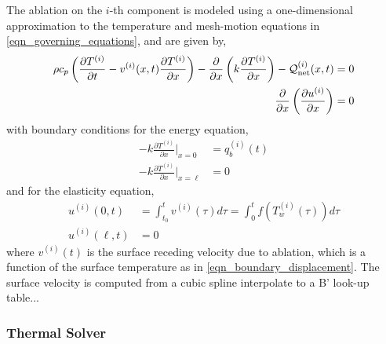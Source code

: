 The ablation on the $i$-th component is modeled using a one-dimensional approximation to the temperature and mesh-motion equations in \cref{eqn_governing_equations}, and are given by,
\begin{subequations}
    \begin{align}
        \rho c_p\left(\frac{\partial T^{(i)}}{\partial t} - v^{(i)}(x,t)\frac{\partial T^{(i)}}{\partial x}\right) - \frac{\partial}{\partial x}\left(k\frac{\partial T^{(i)}}{\partial x}\right) - \mathcal{Q}^{(i)}_{\text{net}}(x,t) &= 0\label{eqn_thermal_1d}\\
        \frac{\partial}{\partial x}\left(\frac{\partial u^{(i)}}{\partial x}\right) &= 0\label{eqn_elasticity_1d}
    \end{align}\label{eqn_rpm}
\end{subequations}
with boundary conditions for the energy equation,
\begin{subequations}
    \begin{align}
        -k\frac{\partial T^{(i)}}{\partial x}\Bigg|_{x=0} &= q^{(i)}_b(t)\\
        -k\frac{\partial T^{(i)}}{\partial x}\Bigg|_{x=\ell} &= 0
    \end{align}
\end{subequations}
and for the elasticity equation,
\begin{subequations}
    \begin{align}
        u^{(i)}(0,t) &= \int_{t_0}^{t}v^{(i)}(\tau)d\tau = \int_{0}^{t} f(T^{(i)}_w(\tau))d\tau\\
        u^{(i)}(\ell,t) &= 0
    \end{align}
\end{subequations}
where $v^{(i)}(t)$ is the surface receding velocity due to ablation, which is a function of the surface temperature as in \cref{eqn_boundary_displacement}. The surface velocity is computed from a cubic spline interpolate to a B' look-up table...



\subsubsection{Thermal Solver}

